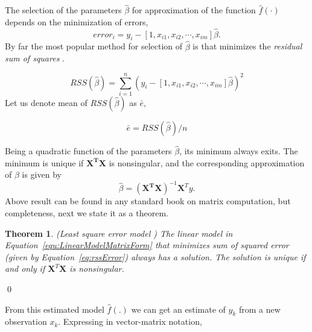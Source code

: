 \documentclass[10pt,myheadings]{IEEEtran}
\newcommand{\matr}[1]{\bm{#1}}
\newtheorem{theorem}{Theorem}
\begin{document}
	\par
	The selection of the parameters $\hat{\beta}$ for approximation of the function $\hat{f}(\cdot)$ depends on the minimization of errors,
\begin{equation}
error_i = y_i - [1,x_{i1},x_{i2},\cdots,x_{im}]\hat{\beta}.
\label{eq:Error}
\end{equation}
By far the most popular method for selection of $\hat{\beta}$ is that minimizes the \emph{residual sum of squares} 
\cite{Hastie2008}.

\begin{equation}
RSS(\hat{\beta}) = \sum_{i=1}^n \left(y_i-[1,x_{i1},x_{i2},\cdots,x_{im}]\hat{\beta}\right)^2
\label{eq:rssError}
\end{equation}
Let us denote mean of $ RSS(\hat{\beta})$ as $\bar{e}$,

\begin{equation}
\bar{e}= RSS(\hat{\beta})/n
\label{eq:MeanError}
\end{equation}

Being a quadratic function of the parameters $\hat{\beta}$, its minimum always exits. The minimum is unique if
	$\boldsymbol{X^TX}$ is nonsingular, and  the corresponding approximation of $\beta$ is given by
	\begin{equation}
	\hat{\beta} = (\boldsymbol{X^TX})^{-1}\boldsymbol{X}^Ty.
		\label{equ:linRegression}
	\end{equation}
	Above result can be found in any standard book on matrix computation, but completeness, next we state it as a theorem.
	\begin{theorem} \emph{(Least square error model\cite{MatrixCompStewart1973} )}
	\label{LeastSquareErrorModel}
The linear model in Equation~\ref{equ:LinearModelMatrixForm} that minimizes sum of squared error (given by Equation~\ref{eq:rssError}) always has a solution. The solution is unique if and only if $\matr{X}^T\matr{X}$ is nonsingular.
	\end{theorem}
	\hfill\qed
	
	From this estimated model $\hat{f}(.)$ we can get an estimate of $y_k$ from a new observation $x_k$.
	Expressing in vector-matrix notation, 
	
\end{document}
